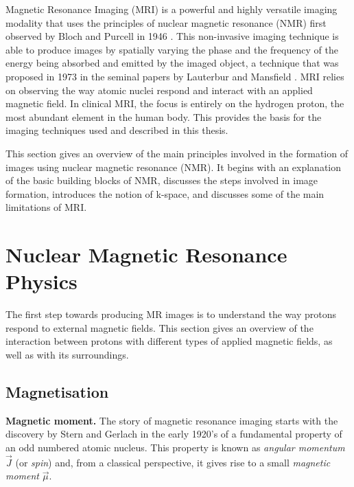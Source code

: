 
Magnetic Resonance Imaging (MRI) is a powerful and highly versatile imaging 
modality that uses the principles of nuclear magnetic resonance (NMR) 
first observed by Bloch and Purcell in 1946 \cite{Bloch1946} 
\cite{Purcell1946}.
This non-invasive imaging technique is able to produce images by spatially 
varying the phase and the frequency of the energy being absorbed and 
emitted by the imaged object, a technique that was proposed in 1973 
in the seminal papers by Lauterbur \cite{Lauterbur1973} and Mansfield \cite{Mansfield1973}. 
MRI relies on observing the way atomic nuclei 
respond and interact with an applied magnetic field. 
In clinical MRI, the focus is entirely on the hydrogen proton, 
the most abundant element in the human body. 
This provides the basis for the imaging techniques used and described in this thesis.

\hfill

This section gives an overview of the main principles involved in the 
formation of images using nuclear magnetic resonance (NMR). 
It begins with an explanation of the basic building blocks of NMR, %
discusses the steps involved in image formation, %
introduces the notion of k-space, %
and discusses some of the main limitations of MRI.

\section{Nuclear Magnetic Resonance Physics}\label{chapterlabel2sec11}
The first step towards producing MR images is to understand the way protons respond to
external magnetic fields. 
This section gives an overview of the interaction between protons with different types of applied magnetic fields, as well as with its surroundings.

\hfill

\subsection{Magnetisation}

\textbf{Magnetic moment.}
The story of magnetic resonance imaging starts with the discovery 
by Stern and Gerlach in the early 1920's of a fundamental property of an 
odd numbered atomic nucleus. This property is known as \textit{angular momentum $\vec{J}$} (or \textit{spin}) and, from a classical perspective, it gives rise to a small \textit{magnetic moment} $\vec{\mu}$. 

